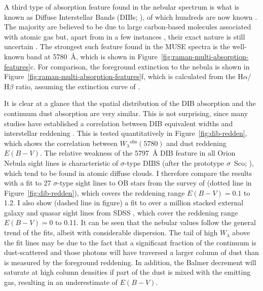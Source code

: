 \documentclass[useAMS, usenatbib, a4paper]{mnras}
\newcommand\ha{\ensuremath{\text{H}\alpha}}
\newcommand\hb{\ensuremath{\text{H}\beta}}
\newcommand\observed{\ensuremath{^{\text{obs}}}}
\begin{document}
A third type of absorption feature found in the nebular spectrum
is what is known as Diffuse Interstellar Bands (DIBs; \citealp{Heger:1922a}),
of which hundreds are now known \citep{Galazutdinov:2000a, Hobbs:2008a}.
The majority are believed to be due to large carbon-based molecules
associated with atomic gas \citep{Sonnentrucker:2014a}
but, apart from in a few instances \citep{Cordiner:2019a},
their exact nature is still uncertain \citep{Tielens:2014a, Omont:2019a, Lai:2020a}.
The strongest such feature found in the MUSE spectra is the well-known band
at \SI{5780}{\angstrom}, which is shown in Figure~\ref{fig:raman-multi-absorption-features}c.
For comparison, the foreground extinction to the nebula is shown in
Figure~\ref{fig:raman-multi-absorption-features}f,
which is calculated from the \ha{}/\hb{} ratio,
assuming the extinction curve of \citet{Blagrave:2007a}.

It is clear at a glance that the spatial distribution of the
DIB absorption and the continuum dust absorption are very similar.
This is not surprising, since many studies have established
a correlation between DIB equivalent widths and interstellar reddening
\citep{Friedman:2011a, Kos:2013a, Baron:2015a, Kreowski:2019b}.
This is tested quantitatively in Figure~\ref{fig:dib-redden},
which shows the correlation between \(W_\lambda\observed(5780)\)
and dust reddening \(E(B - V)\).
The relative weakness of the \SI{5797}{\angstrom} DIB feature in all
Orion Nebula sight lines is characteristic of \(\sigma\)-type DIBS
(after the prototype \(\sigma\)~Sco; \citealp{Krelowski:1988a}),
which tend to be found in atomic diffuse clouds. 
I therefore compare the results with a fit to 27 \(\sigma\)-type sight lines to
OB stars from the survey of \citet{Kos:2013a} (dotted line in Figure~\ref{fig:dib-redden}),
which covers the reddening range \(E(B - V) = 0.1\) to \num{1.2}.
I also show (dashed line in figure) a fit to over a million stacked external galaxy and quasar sight lines from SDSS \citep{Baron:2015a}, which cover the reddening range
\(E(B - V) = 0\) to \num{0.11}.
It can be seen that the nebular values follow the general trend of the fits,
albeit with considerable dispersion.
The tail of high \(W_\lambda\) above the fit lines may be due to the fact that
a significant fraction of the continuum is dust-scattered and those photons
will have traversed a larger column of dust than is measured by the foreground reddening.
In addition, the Balmer decrement will saturate at high column densities
if part of the dust is mixed with the emitting gas, resulting in an underestimate
of \(E(B - V)\). 
\end{document}

